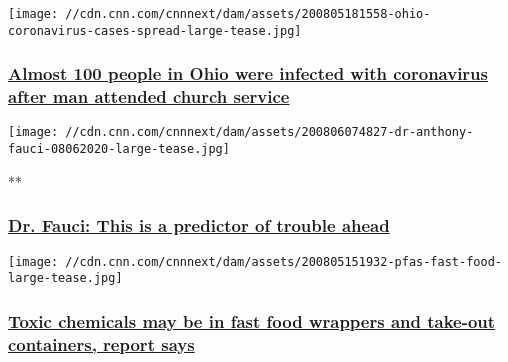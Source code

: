 \href{/2020/08/05/health/ohio-church-coronavirus-spread/index.html}{}

\texttt{[image: //cdn.cnn.com/cnnnext/dam/assets/200805181558-ohio-coronavirus-cases-spread-large-tease.jpg]}

\hypertarget{almost-100-people-in-ohio-were-infected-with-coronavirus-after-man-attended-church-service}{%
\subsubsection{\texorpdfstring{\href{/2020/08/05/health/ohio-church-coronavirus-spread/index.html}{Almost
100 people in Ohio were infected with coronavirus after man attended
church
service}}{Almost 100 people in Ohio were infected with coronavirus after man attended church service}}\label{almost-100-people-in-ohio-were-infected-with-coronavirus-after-man-attended-church-service}}

\href{/videos/health/2020/08/06/dr-anthony-fauci-birx-warning-trouble-ahead-newday-vpx.cnn}{}

\texttt{[image: //cdn.cnn.com/cnnnext/dam/assets/200806074827-dr-anthony-fauci-08062020-large-tease.jpg]}

**

\hypertarget{dr-fauci-this-is-a-predictor-of-trouble-ahead}{%
\subsubsection{\texorpdfstring{\href{/videos/health/2020/08/06/dr-anthony-fauci-birx-warning-trouble-ahead-newday-vpx.cnn}{Dr.
Fauci: This is a predictor of trouble
ahead}}{Dr. Fauci: This is a predictor of trouble ahead}}\label{dr-fauci-this-is-a-predictor-of-trouble-ahead}}

\href{/2020/08/06/health/toxic-food-wrappers-pfas-wellness/index.html}{}

\texttt{[image: //cdn.cnn.com/cnnnext/dam/assets/200805151932-pfas-fast-food-large-tease.jpg]}

\hypertarget{toxic-chemicals-may-be-in-fast-food-wrappers-and-take-out-containers-report-says}{%
\subsubsection{\texorpdfstring{\href{/2020/08/06/health/toxic-food-wrappers-pfas-wellness/index.html}{Toxic
chemicals may be in fast food wrappers and take-out containers, report
says}}{Toxic chemicals may be in fast food wrappers and take-out containers, report says}}\label{toxic-chemicals-may-be-in-fast-food-wrappers-and-take-out-containers-report-says}}

